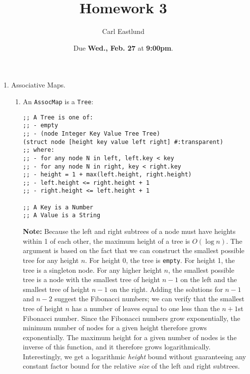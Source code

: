 \documentclass{article}
\title{Homework 3}
\author{Carl Eastlund}
\date{Due \textbf{Wed., Feb. 27} at \textbf{9:00pm}.}
\begin{document}
\maketitle

\newcommand\link[2][http://]{\href{#1#2}{\nolinkurl{#2}}}
\newcommand\http[1]{\link[http://]{#1}}
\newcommand\https[1]{\link[https://]{#1}}
\newcommand\email[1]{\link[mailto:]{#1}}

\bigskip

\newcommand\file\texttt
\newcommand\code\texttt
\newcommand\?{\mbox{\code{?}}}
\newcommand\ty\texttt

\begin{enumerate}

\item Associative Maps.
  \begin{enumerate}
  \item An \ty{AssocMap} is a \ty{Tree}:

\begin{verbatim}
;; A Tree is one of:
;; - empty
;; - (node Integer Key Value Tree Tree)
(struct node [height key value left right] #:transparent)
;; where:
;; - for any node N in left, left.key < key
;; - for any node N in right, key < right.key
;; - height = 1 + max(left.height, right.height)
;; - left.height <= right.height + 1
;; - right.height <= left.height + 1

;; A Key is a Number
;; A Value is a String
\end{verbatim}

  \textbf{Note:} Because the left and right subtrees of a node must have heights
  within 1 of each other, the maximum height of a tree is \(O(\log n)\).  The
  argument is based on the fact that we can construct the smallest possible tree
  for any height \(n\).  For height 0, the tree is \code{empty}.  For height 1,
  the tree is a singleton node.  For any higher height \(n\), the smallest
  possible tree is a node with the smallest tree of height \(n-1\) on the left
  and the smallest tree of height \(n-1\) on the right.  Adding the solutions
  for \(n-1\) and \(n-2\) suggest the Fibonacci numbers; we can verify that the
  smallest tree of height \(n\) has a number of leaves equal to one less than
  the \(n+1\)st Fibonacci number.  Since the Fibonacci numbers grow
  exponentially, the minimum number of nodes for a given height therefore grows
  exponentially.  The maximum height for a given number of nodes is the inverse
  of this function, and it therefore grows logarithmically.  Interestingly, we
  get a logarithmic \emph{height} bound without guaranteeing any constant factor
  bound for the relative \emph{size} of the left and right subtrees.
  

\end{enumerate}
\end{enumerate}
\end{document}
